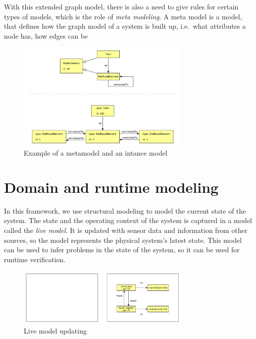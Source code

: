 With this extended graph model, there is also a need to give rules for certain types of models, which is the role of \emph{meta modeling}.
A meta model is a model, that defines how the graph model of a system is built up, i.e.\ what attributes a node has, how edges can be 



\begin{figure}[h]
	\begin{center}
		\includegraphics[width=0.75\textwidth]{figures/metamodel.pdf}
		\caption{ Example of a metamodel and an intance model }
		\label{fig:metamodel}
	\end{center}
\end{figure}


\section{Domain and runtime modeling}

In this framework, we use structural modeling to model the current state of the system. 
The state and the operating context of the system is captured in a model called the \emph{live model}.
It is updated with sensor data and information from other sources, so the model represents the physical system's latest state. 
This model can be used to infer problems in the state of the system, so it can be used for runtime verification.



\begin{figure}[h]
	\begin{center}
		\includegraphics[width=0.75\textwidth]{figures/live-models.pdf}
		\caption{Live model updating}
		\label{fig:live-models}
	\end{center}
\end{figure}

